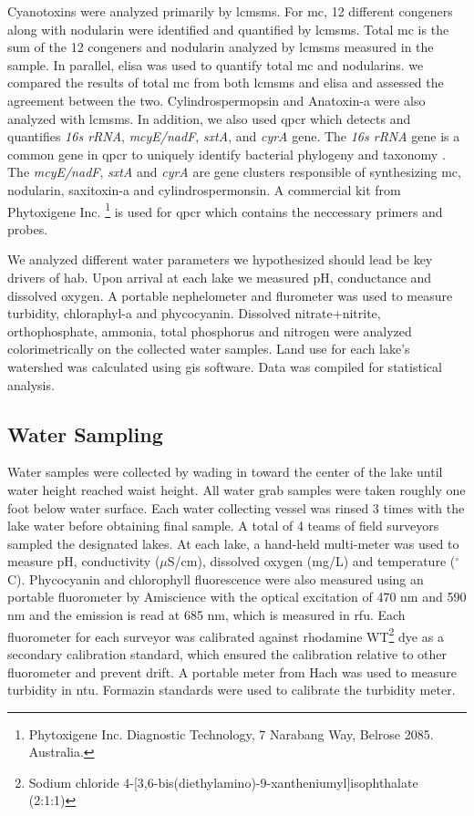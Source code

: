 Cyanotoxins were analyzed primarily by \gls{lcmsms}. For \gls{mc}, 12 different congeners along with nodularin were identified and quantified by \gls{lcmsms}. Total \gls{mc} is the sum of the 12 congeners and nodularin analyzed by \gls{lcmsms} measured in the sample. In parallel, \gls{elisa} was used to quantify total \gls{mc} and nodularins.  we compared the results of total \gls{mc} from both \gls{lcmsms} and \gls{elisa} and assessed the agreement between the two. Cylindrospermopsin and Anatoxin-a were also analyzed with \gls{lcmsms}. In addition, we also used \gls{qpcr} which detects and quantifies \emph{16s rRNA}, \emph{mcyE/nadF}, \emph{sxtA}, and \emph{cyrA} gene. The \emph{16s rRNA} gene is a common gene in \gls{qpcr} to uniquely identify bacterial phylogeny and taxonomy \cite{janda_16s_2007}.  The \emph{mcyE/nadF}, \emph{sxtA} and \emph{cyrA} are gene clusters responsible of synthesizing \gls{mc}, nodularin, saxitoxin-a and cylindrospermonsin. A commercial kit from Phytoxigene Inc. \footnote{Phytoxigene Inc. Diagnostic Technology, 7 Narabang Way, Belrose 2085. Australia.} is used for \gls{qpcr} which contains the neccessary primers and probes.  

We analyzed different water parameters we hypothesized should lead be key drivers of \gls{hab}. Upon arrival at each lake we measured pH, conductance and dissolved oxygen. A portable nephelometer and flurometer was used to measure turbidity, chloraphyl-a and phycocyanin. Dissolved nitrate+nitrite, orthophosphate, ammonia, total phosphorus and nitrogen were analyzed colorimetrically on the collected water samples. Land use for each lake's watershed was calculated using \gls{gis} software. Data was compiled for statistical analysis.




\subsection{Water Sampling} \label{sampling}

Water samples were collected by wading in toward the center of the lake until water height reached waist height. All water grab samples were taken roughly one foot below water surface. Each water collecting vessel was rinsed 3 times with the lake water before obtaining final sample. A total of 4 teams of field surveyors sampled the designated lakes. At each lake, a hand-held multi-meter was used to measure pH, conductivity ($\mu$S/cm), dissolved oxygen (mg/L) and temperature ($^\circ$C). Phycocyanin and chlorophyll fluorescence were also measured using an portable fluorometer by Amiscience with the optical excitation of 470 nm and 590 nm and the emission is read at 685 nm, which is measured in \gls{rfu}. Each fluorometer for each surveyor was calibrated against rhodamine WT\footnote{Sodium chloride 4-[3,6-bis(diethylamino)-9-xantheniumyl]isophthalate (2:1:1)} dye as a secondary calibration standard, which ensured the calibration relative to other fluorometer and prevent drift. A portable meter from Hach was used to measure turbidity in \gls{ntu}. Formazin standards were used to calibrate the turbidity meter.

